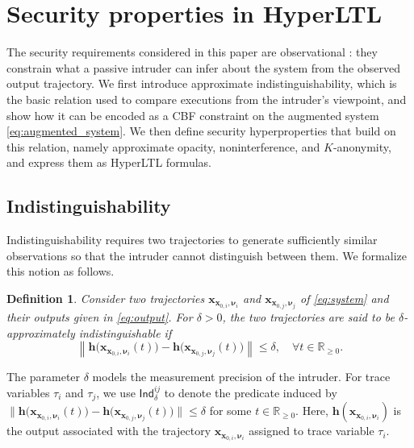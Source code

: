 \documentclass[journal,twoside,web]{ieeecolor}
\newtheorem{definition}[theorem]{Definition}
\begin{document}
\section{Security properties in HyperLTL}
\label{sec:security}

The security requirements considered in this paper are observational \cite{cui2026}: they constrain what a passive intruder can infer about the system from the observed output trajectory. We first introduce approximate indistinguishability, which is the basic relation used to compare executions from the intruder's viewpoint, and show how it can be encoded as a CBF constraint on the augmented system \eqref{eq:augmented_system}. We then define security hyperproperties that build on this relation, namely approximate opacity, noninterference, and $K$-anonymity, and express them as HyperLTL formulas.

\subsection{Indistinguishability} \label{subsec:indistinguishability}

Indistinguishability requires two trajectories to generate sufficiently similar observations so that the intruder cannot distinguish between them. We formalize this notion as follows.

\begin{definition} \label{def:approx_indistinguishability}
Consider two trajectories $\mathbf{x}_{\mathbf{x}_{0,i}, \boldsymbol{\nu}_i}$ and
$\mathbf{x}_{\mathbf{x}_{0,j}, \boldsymbol{\nu}_j}$ of \eqref{eq:system} and their outputs given in \eqref{eq:output}. For $\delta > 0$, the two trajectories are said to be $\delta$-\emph{approximately indistinguishable} if
    \begin{equation} \label{eq:indistinguishability}
        \left\| \mathbf{h} \big( \mathbf{x}_{\mathbf{x}_{0,i}, \boldsymbol{\nu}_i}(t)\big) - \mathbf{h} \big( \mathbf{x}_{\mathbf{x}_{0,j}, \boldsymbol{\nu}_j}(t) \big) \right\| \le \delta, \quad \forall t\in\mathbb{R}_{\ge 0}.
    \end{equation}
\end{definition}

The parameter $\delta$ models the measurement precision of the intruder. For trace variables $\tau_i$ and $\tau_j$, we use $\mathsf{Ind}_{\delta}^{ij}$ to denote the predicate induced by $\| \mathbf{h} \big( \mathbf{x}_{\mathbf{x}_{0,i}, \boldsymbol{\nu}_i}(t) \big) - \mathbf{h} \big( \mathbf{x}_{\mathbf{x}_{0,j}, \boldsymbol{\nu}_j}(t) \big) \| \le \delta$ for some $t \in \mathbb{R}_{\ge 0}$. Here, $\mathbf{h}(\mathbf{x}_{\mathbf{x}_{0,i}, \boldsymbol{\nu}_i})$ is the output associated with the trajectory $\mathbf{x}_{\mathbf{x}_{0,i}, \boldsymbol{\nu}_i}$ assigned to trace variable $\tau_i$.
\end{document}
